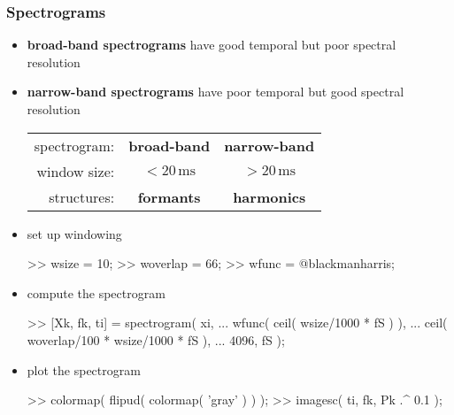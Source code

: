 \begin{frame}[fragile] %
	\frametitle{Spectrograms}
	\begin{itemize}
		\item \textbf{broad-band spectrograms} have good temporal but poor spectral resolution
		\item \textbf{narrow-band spectrograms} have poor temporal but good spectral resolution
			\begin{table}
				\hspace{-2em}
				\small
				\begin{tabular}{rcc}
					spectrogram:&\textbf{broad-band}&\textbf{narrow-band}\\
					window size:&$<\!20\,\textrm{ms}$&$>\!20\,\textrm{ms}$\\
					structures:&\textbf{formants}&\textbf{harmonics}
				\end{tabular}
			\end{table}
		\item set up windowing
			\begin{code}
>> wsize = 10; \color{medium}%
>> woverlap = 66; \color{medium}%
>> wfunc = @blackmanharris; \color{medium}%
			\end{code}
		\item compute the spectrogram
			\begin{code}
>> [Xk, fk, ti] = spectrogram( xi, ... \color{medium}%
	wfunc( ceil( wsize/1000 * fS ) ), ... \color{medium}%
	ceil( woverlap/100 * wsize/1000 * fS ), ... \color{medium}%
	4096, fS ); %
			\end{code}
		\item plot the spectrogram
			\begin{code}
>> colormap( flipud( colormap( 'gray' ) ) ); \color{medium} %
>> imagesc( ti, fk, Pk .^ 0.1 ); \color{medium} %
			\end{code}
	\end{itemize}
\end{frame}
